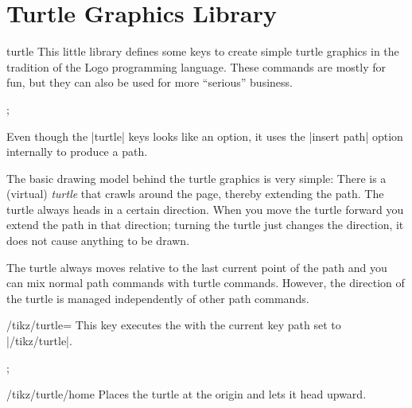 %
%
%

\section{Turtle Graphics Library}
\label{section-library-tutrle}


\begin{pgflibrary}{turtle}
  This little library defines some keys to create simple turtle
  graphics in the tradition of the Logo programming language. These
  commands are mostly for fun, but they can also be used for more
  ``serious'' business.
\begin{codeexample}[]
\tikz[turtle/distance=2mm]
  \draw [turtle={home,forward,right,forward,left,forward,left,forward}];
\end{codeexample}
\end{pgflibrary}

Even though the |turtle| keys looks like an option, it uses the
|insert path| option internally to produce a path.

The basic drawing model behind the turtle graphics is very simple:
There is a (virtual) \emph{turtle} that crawls around the page,
thereby extending the path. The turtle always heads in a certain
direction. When you move the turtle forward you extend the path in
that direction; turning the turtle just changes the direction, it does
not cause anything to be drawn.

The turtle always moves relative to the last current point of the
path and you can mix normal path commands with turtle
commands. However, the direction of the turtle is managed
independently of other path commands.

\begin{key}{/tikz/turtle=}
  This key executes the  with the current key path set to
  |/tikz/turtle|.
\begin{codeexample}[]
\tikz[turtle/distance=2mm]
  \draw [turtle={home,fd,rt,fd,lt,fd,lt,fd}];
\end{codeexample}
\end{key}

\begin{key}{/tikz/turtle/home}
  Places the turtle at the origin and lets it head upward.
\end{key}

